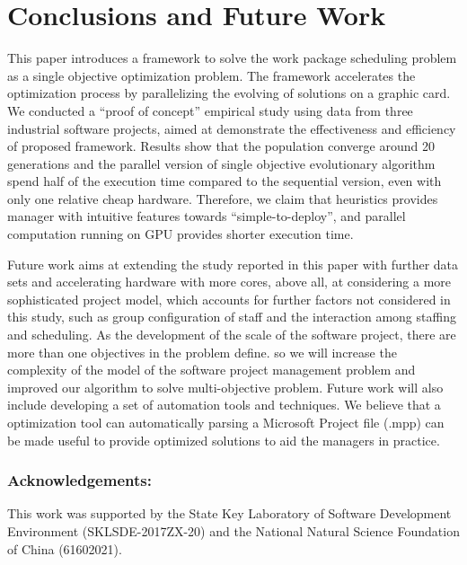 %
%

\section{Conclusions and Future Work}
\vspace{-2mm}

This paper introduces a framework to solve the work package scheduling problem as a single objective optimization problem. The framework accelerates the optimization process by parallelizing the evolving of solutions on a graphic card. 
We conducted a ``proof of concept'' empirical study using data from three industrial software projects, aimed at demonstrate the effectiveness and efficiency of proposed framework.
Results show that the population converge around 20 generations and the parallel version of single objective evolutionary algorithm spend half of the execution time compared to the sequential version, even with only one relative cheap hardware. 
Therefore, we claim that heuristics provides manager with intuitive features towards ``simple-to-deploy'', and parallel computation running on GPU provides shorter execution time.

Future work aims at extending the study reported in this paper with further data sets and accelerating hardware with more cores, above all, at considering a more sophisticated project model, which accounts for further factors not considered in this study, such as group configuration of staff and the interaction among staffing and scheduling.
As the development of the scale of the software project, there are more than one objectives in the problem define. so we will increase the complexity of the model of the software project management problem and improved our algorithm to solve multi-objective problem.
Future work will also include developing a set of automation tools and techniques. We believe that a optimization tool can automatically parsing a Microsoft Project file (.mpp) can be made useful to provide optimized solutions to aid the managers in practice.
\vspace{-4mm}
\subsubsection{\small{Acknowledgements:}} \small{This work was supported by the State Key Laboratory of Software Development Environment (SKLSDE-2017ZX-20) and the National Natural Science Foundation of China (61602021).}
\vspace{-3mm}

